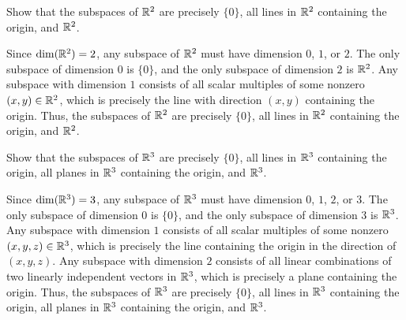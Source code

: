 \begin{exc}

\begin{exercise}
Show that the subspaces of $\mathbb{R}^2$ are precisely $\{0\}$, all lines in $\mathbb{R}^2$
containing the origin, and $\mathbb{R}^2$.
\end{exercise}
\begin{solution}

Since $\operatorname{dim}(\mathbb{R}^2)=2$, any subspace of $\mathbb{R}^2$ must have dimension $0$, $1$, or
$2$. The only subspace of dimension $0$ is $\{0\}$, and the only subspace of
dimension $2$ is $\mathbb{R}^2$. Any subspace with dimension $1$ consists of all scalar
multiples of some nonzero $(x,y)\in\mathbb{R}^2$, which is precisely the line with
direction $(x,y)$ containing the origin. Thus, the subspaces of $\mathbb{R}^2$ are
precisely $\{0\}$, all lines in $\mathbb{R}^2$ containing the origin, and $\mathbb{R}^2$.
\end{solution}

\begin{exercise}
Show that the subspaces of $\mathbb{R}^3$ are precisely $\{0\}$, all lines in $\mathbb{R}^3$
containing the origin, all planes in $\mathbb{R}^3$ containing the origin, and $\mathbb{R}^3$.
\end{exercise}
\begin{solution}
Since $\operatorname{dim}(\mathbb{R}^3)=3$, any subspace of $\mathbb{R}^3$ must have dimension $0$, $1$, $2$,
or $3$. The only subspace of dimension $0$ is $\{0\}$, and the only subspace of
dimension $3$ is $\mathbb{R}^3$. Any subspace with dimension $1$ consists of all scalar
multiples of some nonzero $(x,y,z)\in\mathbb{R}^3$, which is precisely the line
containing the origin in the direction of $(x,y,z)$. Any subspace with
dimension $2$ consists of all linear combinations of two linearly independent
vectors in $\mathbb{R}^3$, which is precisely a plane containing the origin. Thus, the
subspaces of $\mathbb{R}^3$ are precisely $\{0\}$, all lines in $\mathbb{R}^3$ containing the
origin, all planes in $\mathbb{R}^3$ containing the origin, and $\mathbb{R}^3$.
\end{solution}


\end{exc}

